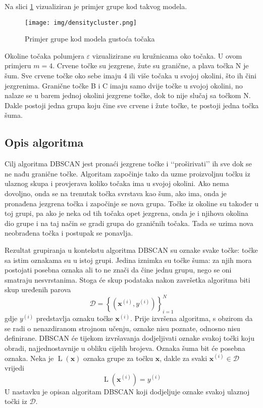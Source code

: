 \documentclass[times, utf8, zavrsni]{fer}
\begin{document}
Na slici \ref{fig:densitycluster} vizualiziran je primjer grupe kod takvog modela.
\begin{figure}[H]
    \centering
    \texttt{[image: img/densitycluster.png]}
    \caption{Primjer grupe kod modela gustoća točaka}
    \label{fig:densitycluster}
\end{figure} Okoline točaka polumjera $\varepsilon$ vizualizirane su kružnicama oko točaka. U ovom primjeru $m = 4$. Crvene točke su jezgrene, žute su granične, a plava točka N je šum. Sve crvene točke oko sebe imaju 4 ili više točaka u svojoj okolini, što ih čini jezgrenima. Granične točke B i C imaju samo dvije točke u svojoj okolini, no nalaze se u barem jednoj okolini jezgrene točke, dok to nije slučaj sa točkom N. Dakle postoji jedna grupa koju čine sve crvene i žute točke, te postoji jedna točka šuma.

\subsection{Opis algoritma}
Cilj algoritma DBSCAN jest pronaći jezgrene točke i ‘‘proširivati’’ ih sve dok se ne nađu granične točke. Algoritam započinje tako da uzme proizvoljnu točku iz ulaznog skupa i provjerava koliko točaka ima u svojoj okolini. Ako nema dovoljno, onda se na trenutak točka svrstava kao šum, ako ima, onda je pronađena jezgrena točka i započinje se nova grupa. Točke iz okoline su također u toj grupi, pa ako je neka od tih točaka opet jezgrena, onda je i njihova okolina dio grupe i na taj način se gradi grupa do graničnih točaka. Tada se uzima nova neobrađena točka i postupak se ponavlja.

Rezultat grupiranja u kontekstu algoritma DBSCAN su oznake svake točke: točke sa istim oznakama su u istoj grupi. Jedina iznimka su točke šuma: za njih mora postojati posebna oznaka ali to ne znači da čine jednu grupu, nego se oni smatraju nesvrstanima. Stoga će skup podataka nakon završetka algoritma biti skup uređenih parova
\[\mathcal{D} = \left\{
    \left( \mathbf{x}^{(i)}, y^{(i)}  \right)
\right\}_{i=1}^{N}\]
gdje $y^{(i)}$ predstavlja oznaku točke $\mathbf{x}^{(i)}$. Prije izvršena algoritma, s obzirom da se radi o nenazdiranom strojnom učenju, oznake nisu poznate, odnosno nisu definirane. DBSCAN će tijekom izvršavanja dodjeljivati oznake svakoj točki koju obradi, najjednostavnije u obliku cijelih brojeva. Oznaka šuma bit će posebna oznaka. Neka je $\operatorname{L} \left(\mathbf{x}\right)$ oznaka grupe za točku $\mathbf{x}$, dakle za svaki $\mathbf{x}^{(i)} \in \mathcal{D}$ vrijedi
\[\operatorname{L} \left(\mathbf{x}^{(i)}\right) = y^{(i)}\]
U nastavku je opisan algoritam DBSCAN koji dodjeljuje oznake svakoj ulaznoj točki iz $\mathcal{D}$.
\end{document}
